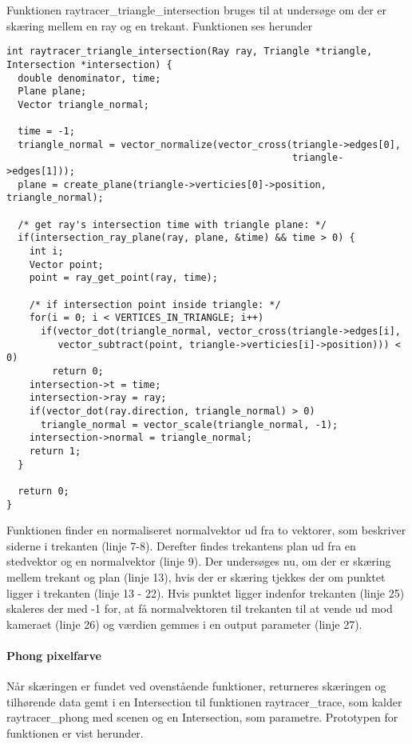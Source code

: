 Funktionen raytracer\_triangle\_intersection bruges til at undersøge om der er skæring mellem en ray og en trekant. Funktionen ses herunder

\begin{lstlisting}[style=Cstyle, caption=Funktionen, der finder skæring med trekant]
int raytracer_triangle_intersection(Ray ray, Triangle *triangle, Intersection *intersection) {
  double denominator, time;
  Plane plane;
  Vector triangle_normal;
  
  time = -1;
  triangle_normal = vector_normalize(vector_cross(triangle->edges[0], 
                                                  triangle->edges[1]));
  plane = create_plane(triangle->verticies[0]->position, triangle_normal);

  /* get ray's intersection time with triangle plane: */
  if(intersection_ray_plane(ray, plane, &time) && time > 0) {
    int i;
    Vector point;
    point = ray_get_point(ray, time);
    
    /* if intersection point inside triangle: */
    for(i = 0; i < VERTICES_IN_TRIANGLE; i++)
      if(vector_dot(triangle_normal, vector_cross(triangle->edges[i], 
         vector_subtract(point, triangle->verticies[i]->position))) < 0)
        return 0;
    intersection->t = time;
    intersection->ray = ray;
    if(vector_dot(ray.direction, triangle_normal) > 0)
      triangle_normal = vector_scale(triangle_normal, -1);
    intersection->normal = triangle_normal;
    return 1;
  }

  return 0;
}
\end{lstlisting}

Funktionen finder en normaliseret normalvektor ud fra to vektorer, som beskriver siderne i trekanten (linje 7-8). Derefter findes trekantens plan ud fra en stedvektor og en normalvektor (linje 9). Der undersøges nu, om der er skæring mellem trekant og plan (linje 13), hvis der er skæring tjekkes der om punktet ligger i trekanten (linje 13 - 22). Hvis punktet ligger indenfor trekanten (linje 25) skaleres der med -1 for, at få normalvektoren til trekanten til at vende ud mod kameraet (linje 26) og værdien gemmes i en output parameter (linje 27).

\paragraph{Phong pixelfarve}
Når skæringen er fundet ved ovenstående funktioner, returneres skæringen og tilhørende data gemt i en Intersection til funktionen raytracer\_trace, som kalder raytracer\_phong med scenen og en Intersection, som parametre. Prototypen for funktionen er vist herunder.


